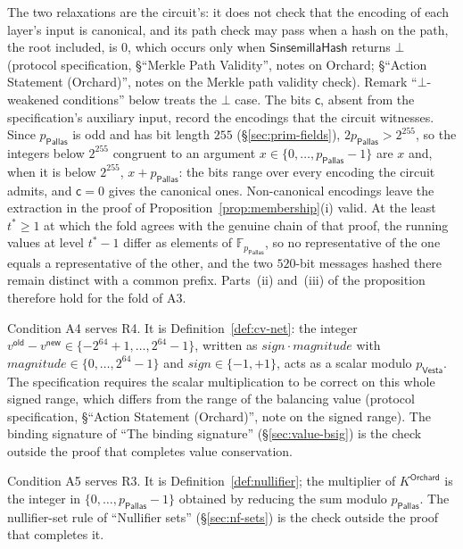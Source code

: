 \documentclass[11pt,a4paper]{article}
\theoremstyle{definition}
\newcommand{\F}{\mathbb{F}}
\newcommand{\Pallas}{\ensuremath{\mathsf{Pallas}}}
\newcommand{\Vesta}{\ensuremath{\mathsf{Vesta}}}
\begin{document}
The two relaxations are the circuit's: it does not check that the encoding
of each layer's input is canonical, and its path check may pass when a hash
on the path, the root included, is $0$, which occurs only when
$\mathsf{SinsemillaHash}$ returns $\bot$ (protocol specification,
\S``Merkle Path Validity'', notes on Orchard; \S``Action Statement
(Orchard)'', notes on the Merkle path validity check). Remark
``$\bot$-weakened conditions'' below treats the $\bot$ case. The bits
$\mathsf{c}$, absent from the specification's auxiliary input, record the
encodings that the circuit witnesses. Since $p_{\Pallas}$ is odd and has bit
length $255$ (\S\ref{sec:prim-fields}), $2 p_{\Pallas} > 2^{255}$, so the
integers below $2^{255}$ congruent to an argument
$x \in \{0, \dots, p_{\Pallas} - 1\}$ are $x$ and, when it is below
$2^{255}$, $x + p_{\Pallas}$: the bits range over every encoding the circuit
admits, and $\mathsf{c} = 0$ gives the canonical ones. Non-canonical
encodings leave the extraction in the proof of
Proposition~\ref{prop:membership}(i) valid. At the least $t^{*} \ge 1$ at
which the fold agrees with the genuine chain of that proof, the running
values at level $t^{*} - 1$ differ as elements of $\F_{p_{\Pallas}}$, so no
representative of the one equals a representative of the other, and the
two $520$-bit messages hashed there remain distinct with a common prefix.
Parts~(ii) and~(iii) of the proposition therefore hold for the fold of A3.

Condition A4 serves R4. It is Definition~\ref{def:cv-net}: the integer
$v^{\mathsf{old}} - v^{\mathsf{new}} \in \{-2^{64} + 1, \dots, 2^{64} - 1\}$,
written as $\mathit{sign} \cdot \mathit{magnitude}$ with
$\mathit{magnitude} \in \{0, \dots, 2^{64} - 1\}$ and
$\mathit{sign} \in \{-1, +1\}$, acts as a scalar modulo $p_{\Vesta}$. The
specification requires the scalar multiplication to be correct on this whole
signed range, which differs from the range of the balancing value (protocol
specification, \S``Action Statement (Orchard)'', note on the signed range).
The binding signature of ``The binding signature'' (\S\ref{sec:value-bsig})
is the check outside the proof that completes value conservation.

Condition A5 serves R3. It is Definition~\ref{def:nullifier}; the multiplier
of $K^{\mathsf{Orchard}}$ is the integer in $\{0, \dots, p_{\Pallas} - 1\}$
obtained by reducing the sum modulo $p_{\Pallas}$. The nullifier-set rule of
``Nullifier sets'' (\S\ref{sec:nf-sets}) is the check outside the proof that
completes it.
\end{document}
